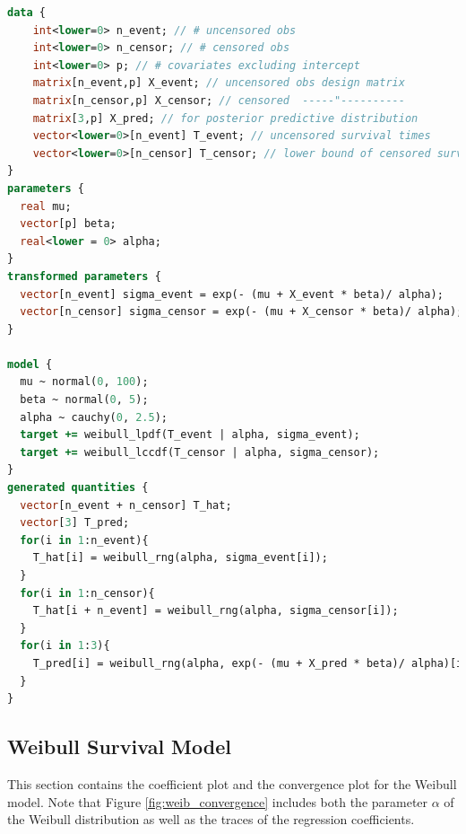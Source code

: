 \begin{lstlisting}[language=Stan, caption = {Weibull Survival Model}, captionpos = t, label = {code:stan_weib}]
data {
    int<lower=0> n_event; // # uncensored obs                                     
    int<lower=0> n_censor; // # censored obs                                    
    int<lower=0> p; // # covariates excluding intercept                                        
    matrix[n_event,p] X_event; // uncensored obs design matrix                           
    matrix[n_censor,p] X_censor; // censored  -----"----------
    matrix[3,p] X_pred; // for posterior predictive distribution
    vector<lower=0>[n_event] T_event; // uncensored survival times                         
    vector<lower=0>[n_censor] T_censor; // lower bound of censored survival times = censor time                  
}
parameters {
  real mu;
  vector[p] beta;
  real<lower = 0> alpha;
}
transformed parameters {
  vector[n_event] sigma_event = exp(- (mu + X_event * beta)/ alpha);
  vector[n_censor] sigma_censor = exp(- (mu + X_censor * beta)/ alpha);
}

model {
  mu ~ normal(0, 100);
  beta ~ normal(0, 5);
  alpha ~ cauchy(0, 2.5);
  target += weibull_lpdf(T_event | alpha, sigma_event);
  target += weibull_lccdf(T_censor | alpha, sigma_censor);
}
generated quantities {
  vector[n_event + n_censor] T_hat;
  vector[3] T_pred;
  for(i in 1:n_event){
    T_hat[i] = weibull_rng(alpha, sigma_event[i]);
  }
  for(i in 1:n_censor){
    T_hat[i + n_event] = weibull_rng(alpha, sigma_censor[i]);
  }
  for(i in 1:3){
    T_pred[i] = weibull_rng(alpha, exp(- (mu + X_pred * beta)/ alpha)[i]); 
  }
}
\end{lstlisting}


\subsection{Weibull Survival Model}
This section contains the coefficient plot and the convergence plot for the Weibull model. Note that Figure \ref{fig:weib_convergence} includes both the parameter $\alpha$ of the Weibull distribution as well as the traces of the regression coefficients.

